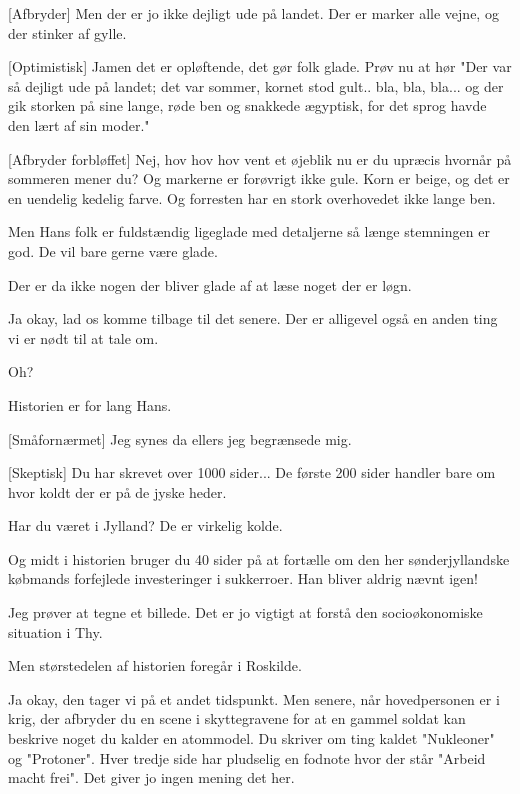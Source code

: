 \documentclass[a4paper,11pt]{article}
\begin{document}
\begin{sketch}
[Afbryder] Men der er jo ikke dejligt ude på landet. Der er marker alle vejne, og der stinker af gylle. 

 [Optimistisk] Jamen det er opløftende, det gør folk glade. Prøv nu at hør "Der var så dejligt ude på landet; det var sommer, kornet stod gult.. bla, bla, bla... og der gik storken på sine lange, røde ben og snakkede ægyptisk, for det sprog havde den lært af sin moder."

[Afbryder forbløffet] Nej, hov hov hov vent et øjeblik nu er du upræcis hvornår på sommeren mener du? Og markerne er forøvrigt ikke gule. Korn er beige, og det er en uendelig kedelig farve. Og forresten har en stork overhovedet ikke lange ben.  %

  Men Hans folk er fuldstændig ligeglade med detaljerne så længe stemningen er god. De vil bare gerne være glade.

 Der er da ikke nogen der bliver glade af at læse noget der er løgn.

  Ja okay, lad os komme tilbage til det senere. Der er alligevel også en anden ting vi er nødt til at tale om.

 Oh?

  Historien er for lang Hans. %

[Småfornærmet] Jeg synes da ellers jeg begrænsede mig.

 [Skeptisk] Du har skrevet over 1000 sider... De første 200 sider handler bare om hvor koldt der er på de jyske heder. 

 Har du været i Jylland? De er virkelig kolde.

  Og midt i historien bruger du 40 sider på at fortælle om den her sønderjyllandske købmands forfejlede investeringer i sukkerroer. Han bliver aldrig nævnt igen! %

 Jeg prøver at tegne et billede. Det er jo vigtigt at forstå den socioøkonomiske situation i Thy.

  Men størstedelen af historien foregår i Roskilde. 

 

  Ja okay, den tager vi på et andet tidspunkt. Men senere, når hovedpersonen er i krig, der afbryder du en scene i skyttegravene for at en gammel soldat kan beskrive noget du kalder en atommodel. Du skriver om ting kaldet "Nukleoner" og "Protoner". Hver tredje side har pludselig en fodnote hvor der står "Arbeid macht frei". Det giver jo ingen mening det her.


\end{sketch}
\end{document}
